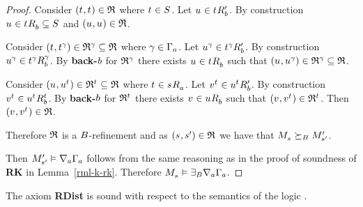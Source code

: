 \begin{proof}
Consider $(\kStateT, \kStateT) \in \refinement$ where $\kStateT \in \kStates$.
Let $\kStateU \in \kSuccessorsPB{\kStateT}$.
By construction $\kStateU \in \kSuccessorsB{\kStateT} \subseteq \kStates$ and $(\kStateU, \kStateU) \in \refinement$.

Consider $(\kStateT, \kStateT[\gamma]) \in \refinement^\gamma \subseteq \refinement$ where $\gamma \in \Gamma_\agentA$.
Let $\kStateU[\gamma] \in \kSuccessorsPB{\kStateT[\gamma]}$.
By construction $\kStateU[\gamma] \in \kSuccessorsB[\gamma]{\kStateT[\gamma]}$.
By {\bf back-$\agentB$} for $\refinement^\gamma$ there exists $\kStateU \in \kSuccessorsB{\kStateT}$ such that $(\kStateU, \kStateU[\gamma]) \in \refinement^\gamma \subseteq \refinement$.

Consider $(\kStateU, \kStateU[\kStateT]) \in \refinement^{\kStateT} \subseteq \refinement$ where $\kStateT \in \kSuccessorsA{\kStateS}$.
Let $\kStateV[\kStateT] \in \kSuccessorsPB{\kStateU[\kStateT]}$.
By construction $\kStateV[\kStateT] \in \kSuccessorsB[\kStateT]{\kStateU[\kStateT]}$.
By {\bf back-$\agentB$} for $\refinement^{\kStateT}$ there exists $\kStateV \in \kSuccessorsB{\kStateU}$ such that $(\kStateV, \kStateV[\kStateT]) \in \refinement^{\kStateT}$.
Then $(\kStateV, \kStateV[\kStateT]) \in \refinement$.

Therefore $\refinement$ is a $\agentsB$-refinement and as $(\kStateS, \kStateSP) \in \refinement$ we have that $\kPModel{\kStateS} \simulatesBs \kPModelP{\kStateSP}$.

Then $\kPModelP{\kStateSP} \entails \coversA \Gamma_\agentA$ follows from the same reasoning as in the proof of soundness of {\bf RK} in Lemma~\ref{rml-k-rk}.
Therefore $\kPModel{\kStateS} \entails \somerefsBs \coversA \Gamma_\agentA$.

\end{proof}

\begin{lemma}
The axiom {\bf RDist} is sound with respect to the semantics of the logic \logicRmlK{}.
\end{lemma}

